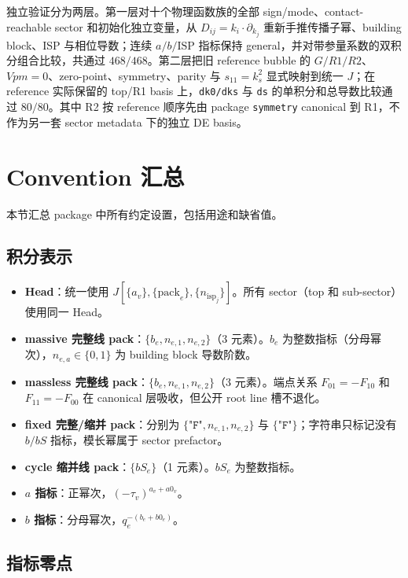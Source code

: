 ﻿\documentclass[a4paper,11pt]{article}
\begin{document}
独立验证分为两层。第一层对十个物理函数族的全部 sign/mode、contact-reachable sector 和初始化独立变量，从 $D_{ij}=k_i\cdot\partial_{k_j}$ 重新手推传播子幂、building block、ISP 与相位导数；连续 $a/b/\mathrm{ISP}$ 指标保持 general，并对带参量系数的双积分组合比较，共通过 $468/468$。第二层把旧 reference bubble 的 $G/R1/R2$、$Vpm=0$、zero-point、symmetry、parity 与 $s_{11}=k_s^2$ 显式映射到统一 $J$；在 reference 实际保留的 top/R1 basis 上，\texttt{dk0/dks} 与 \texttt{ds} 的单积分和总导数比较通过 $80/80$。其中 R2 按 reference 顺序先由 package \texttt{symmetry} canonical 到 R1，不作为另一套 sector metadata 下的独立 DE basis。

\section{Convention 汇总}

本节汇总 package 中所有约定设置，包括用途和缺省值。

\subsection{积分表示}

\begin{itemize}
  \item \textbf{Head}：统一使用 $J[\{a_v\}, \{\text{pack}_e\}, \{n_{\text{isp}_j}\}]$。所有 sector（top 和 sub-sector）使用同一 Head。
  \item \textbf{massive 完整线 pack}：$\{b_e, n_{e,1}, n_{e,2}\}$（3 元素）。$b_e$ 为整数指标（分母幂次），$n_{e,a} \in \{0,1\}$ 为 building block 导数阶数。
  \item \textbf{massless 完整线 pack}：$\{b_e,n_{e,1},n_{e,2}\}$（3 元素）。端点关系 $F_{01}=-F_{10}$ 和 $F_{11}=-F_{00}$ 在 canonical 层吸收，但公开 root line 槽不退化。
  \item \textbf{fixed 完整/缩并 pack}：分别为 $\{\texttt{"F"},n_{e,1},n_{e,2}\}$ 与 $\{\texttt{"F"}\}$；字符串只标记没有 $b/bS$ 指标，模长幂属于 sector prefactor。
  \item \textbf{cycle 缩并线 pack}：$\{bS_e\}$（1 元素）。$bS_e$ 为整数指标。
  \item \textbf{$a$ 指标}：正幂次，$(-\tau_v)^{a_v + a0_v}$。
  \item \textbf{$b$ 指标}：分母幂次，$q_e^{-(b_e + b0_e)}$。
\end{itemize}

\subsection{指标零点}
\end{document}
